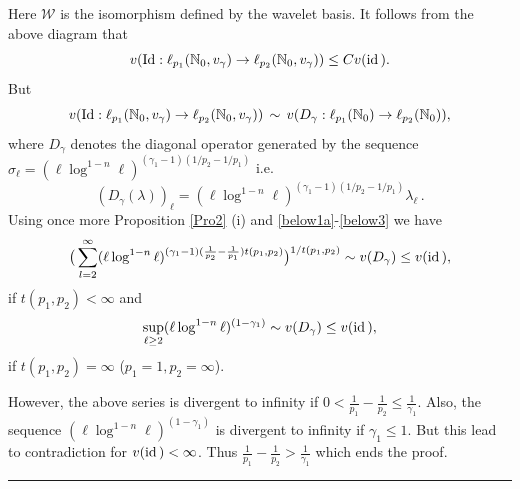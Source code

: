 \documentclass[12pt]{article}
\def\id{\mathop{\rm id \,}\nolimits}
\def\Id{\mathop{\rm Id}\nolimits}
\newcommand{\epr}{\hspace*{\fill}\rule{3mm}{3mm}\\}
\newcommand{\R}{{\mathbb R}}
\newcommand{\N}{{\mathbb N}}
\begin{document}
Here   $\mathcal{W}$ is the isomorphism defined by the wavelet basis.  It follows from the above diagram that  
\begin{equation}\label{below2}
v(\Id: \ell_{p_1}(\N_0,v_\gamma)\rightarrow \ell_{p_2}(\N_0, v_\gamma))\le C  v (\id).
\end{equation} 
But 
\begin{equation}\label{below3}
v(\Id: \ell_{p_1}(\N_0,v_\gamma)\rightarrow \ell_{p_2}(\N_0,v_\gamma))\, \sim \, 
v(D_\gamma: \ell_{p_1}(\N_0)\rightarrow \ell_{p_2}(\N_0)),
\end{equation} 
where  $D_\gamma$ denotes the diagonal operator  generated by the sequence
$\sigma_\ell =  (\ell\log^{1-n}\ell)^{(\gamma_1 - 1)(1/p_2-1/p_1)}$ i.e. 
$$
(D_\gamma(\lambda))_\ell = (\ell\log^{1-n}\ell)^{(\gamma_1 - 1)(1/p_2-1/p_1)} \lambda_\ell\, .
$$ 
Using once more  Proposition \ref{Pro2} (i) and \eqref{below1a}-\eqref{below3} we have
$$   \big(\sum_{l=2}^\infty (\ell\log^{1-n}\ell)^{(\gamma_1-1)(\frac{1}{p_2}-\frac{1}{p_1})t(p_1,p_2)}\big)^{1/t(p_1,p_2)} \sim v(D_\gamma)\le  v (\id),$$
if $t(p_1,p_2)<\infty$ and
$$\sup_{\ell\geq 2}(\ell\log^{1-n}\ell)^{(1-\gamma_1)}\sim v(D_\gamma)\le  v (\id),$$
if $t(p_1,p_2)=\infty$ ($p_1=1, p_2=\infty$).

However, the above series is divergent to infinity if $0<\frac{1}{p_1}-\frac{1}{p_2}\leq \frac{1}{\gamma_{1}}$. 
 Also, the sequence $(\ell\log^{1-n}\ell)^{(1-\gamma_1)}$ is divergent to infinity if $\gamma_{1}\leq 1$.
But this lead to contradiction for $ v(\id)<\infty$.
 Thus $\frac{1}{p_1}-\frac{1}{p_2}> \frac{1}{\gamma_{1}}$ 
which ends the proof.

\epr



\end{document}
